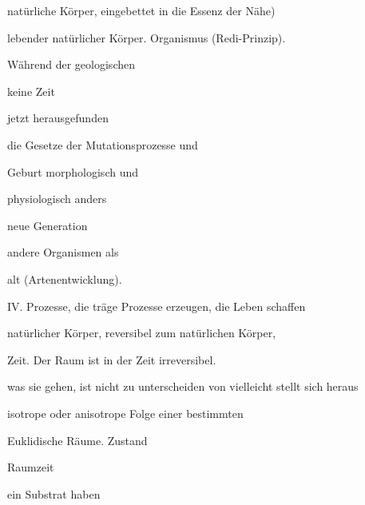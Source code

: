 \documentclass[11pt,a4paper]{book}
\begin{document}
natürliche Körper, eingebettet in die Essenz der Nähe)



lebender natürlicher Körper. Organismus (Redi-Prinzip).



                                   Während der geologischen



                                   keine Zeit



                                   jetzt herausgefunden



                                   die Gesetze der Mutationsprozesse und



                                   Geburt morphologisch und



                                   physiologisch anders



                                   neue Generation



                                   andere Organismen als



                                   alt (Artenentwicklung).



 



IV. Prozesse, die träge Prozesse erzeugen, die Leben schaffen



natürlicher Körper, reversibel zum natürlichen Körper,



Zeit. Der Raum ist in der Zeit irreversibel.



was sie gehen, ist nicht zu unterscheiden von vielleicht stellt sich heraus



isotrope oder anisotrope Folge einer bestimmten



Euklidische Räume. Zustand



                                   Raumzeit



                                   ein Substrat haben
\end{document}
